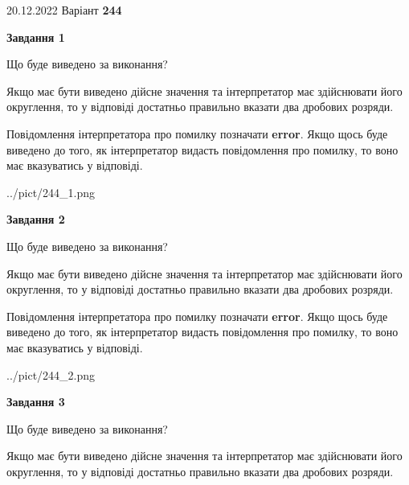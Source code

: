 \documentclass[12pt, ukrainian]{article}
\begin{document}
{20.12.2022 Варіант \No \textbf { 244 }\par}
{
\begin {Large}

{\begin {center}\textbf{Завдання 1}\end {center}}\par
Що буде виведено за виконання? \par

Якщо має бути виведено дійсне значення та інтерпретатор має здійснювати його округлення, 
то у відповіді достатньо правильно вказати два дробових розряди.

Повідомлення інтерпретатора про помилку позначати \textbf{error}.
Якщо щось буде виведено до того, як інтерпретатор видасть повідомлення про помилку, 
то воно має вказуватись у відповіді. \par

\begin{center}
	{../pict/244_1.png}
\end{center}
\newpage

{\begin {center}\textbf{Завдання 2}\end {center}}\par
Що буде виведено за виконання? \par

Якщо має бути виведено дійсне значення та інтерпретатор має здійснювати його округлення, 
то у відповіді достатньо правильно вказати два дробових розряди.

Повідомлення інтерпретатора про помилку позначати \textbf{error}.
Якщо щось буде виведено до того, як інтерпретатор видасть повідомлення про помилку, 
то воно має вказуватись у відповіді. \par

\begin{center}
	{../pict/244_2.png}
\end{center}
\newpage

{\begin {center}\textbf{Завдання 3}\end {center}}\par
Що буде виведено за виконання? \par

Якщо має бути виведено дійсне значення та інтерпретатор має здійснювати його округлення, 
то у відповіді достатньо правильно вказати два дробових розряди.


\end{Large}}
\end{document}

